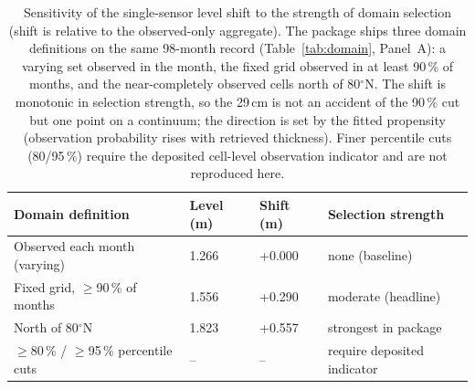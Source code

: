 \begin{table}[htbp]
\centering
\caption{Sensitivity of the single-sensor level shift to the strength of domain
selection (shift is relative to the observed-only aggregate). The package ships
three domain definitions on the same 98-month record
(Table~\ref{tab:domain}, Panel~A): a varying set observed in the month, the fixed
grid observed in at least 90\,\% of months, and the near-completely observed
cells north of 80$^\circ$N. The shift is monotonic in selection strength, so the
29\,cm is not an accident of the 90\,\% cut but one point on a continuum; the
direction is set by the fitted propensity (observation probability rises with
retrieved thickness). Finer percentile cuts (80/95\,\%) require the deposited
cell-level observation indicator and are not reproduced here.}
\label{tab:cutoff}
\footnotesize
\setlength{\tabcolsep}{4pt}
\begin{tabular}{p{4.3cm}p{1.8cm}p{2.2cm}p{3.0cm}}
\toprule
Domain definition & Level (m) & Shift (m) & Selection strength \\
\midrule
Observed each month (varying) & 1.266 & +0.000 & none (baseline) \\
Fixed grid, $\ge$90\,\% of months & 1.556 & +0.290 & moderate (headline) \\
North of 80$^\circ$N & 1.823 & +0.557 & strongest in package \\
\midrule
$\ge$80\,\% / $\ge$95\,\% percentile cuts & -- & -- & require deposited indicator \\
\bottomrule
\end{tabular}
\end{table}

